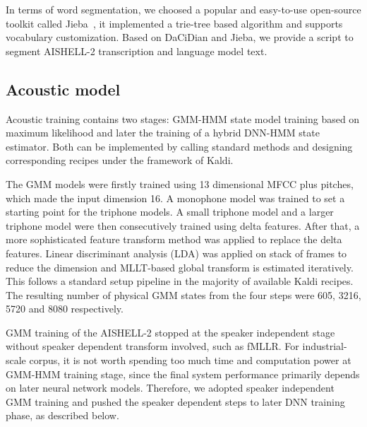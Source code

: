 \documentclass[a4paper]{article}
\begin{document}
In terms of word segmentation, we choosed a popular and easy-to-use open-source
toolkit called Jieba~\cite{jieba}, it implemented a trie-tree based algorithm and
supports vocabulary customization. Based on DaCiDian and Jieba, we provide a
script to segment AISHELL-2 transcription and language model text.

\subsection{Acoustic model}

Acoustic training contains two stages: GMM-HMM state model training based on maximum likelihood and later the training of a hybrid DNN-HMM state estimator. Both can be implemented by calling standard methods and designing corresponding recipes under the framework of Kaldi.

The GMM models were firstly trained using 13 dimensional MFCC plus pitches, which made the input dimension 16.
A monophone model was trained to set a starting point for the triphone models. A small triphone model and a larger triphone model were then consecutively trained using delta features. After that, a more sophisticated feature transform method was applied to replace the delta features. Linear discriminant analysis (LDA) was applied on stack of frames to reduce the dimension and MLLT-based global transform is estimated iteratively. This follows a standard setup pipeline in the majority of available Kaldi recipes. The resulting number of physical GMM states from the four steps were 605, 3216, 5720 and 8080 respectively.

GMM training of the AISHELL-2 stopped at the speaker independent stage without speaker dependent transform involved, such as fMLLR. For industrial-scale corpus, it is not worth spending too much time and computation power at GMM-HMM training stage, since the final system performance primarily depends on later neural network models. Therefore, we adopted speaker independent GMM training and pushed the speaker dependent steps to later DNN training phase, as described below.
\end{document}

